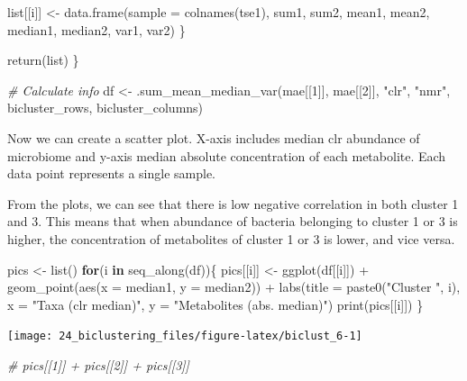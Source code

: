 \documentclass[
]{book}
\newenvironment{Shaded}{\begin{snugshade}}{\end{snugshade}}
\newcommand{\AttributeTok}[1]{\textcolor[rgb]{0.77,0.63,0.00}{#1}}
\newcommand{\CommentTok}[1]{\textcolor[rgb]{0.56,0.35,0.01}{\textit{#1}}}
\newcommand{\ControlFlowTok}[1]{\textcolor[rgb]{0.13,0.29,0.53}{\textbf{#1}}}
\newcommand{\DecValTok}[1]{\textcolor[rgb]{0.00,0.00,0.81}{#1}}
\newcommand{\FunctionTok}[1]{\textcolor[rgb]{0.00,0.00,0.00}{#1}}
\newcommand{\NormalTok}[1]{#1}
\newcommand{\OtherTok}[1]{\textcolor[rgb]{0.56,0.35,0.01}{#1}}
\newcommand{\SpecialCharTok}[1]{\textcolor[rgb]{0.00,0.00,0.00}{#1}}
\newcommand{\StringTok}[1]{\textcolor[rgb]{0.31,0.60,0.02}{#1}}
\begin{document}
\begin{Shaded}
\begin{Highlighting}[]
\NormalTok{    list[[i]] }\OtherTok{\textless{}{-}} \FunctionTok{data.frame}\NormalTok{(}\AttributeTok{sample =} \FunctionTok{colnames}\NormalTok{(tse1), sum1, sum2, mean1, mean2, }
\NormalTok{                     median1, median2, var1, var2)}
\NormalTok{  \}}

  \FunctionTok{return}\NormalTok{(list)}
\NormalTok{\}}

\CommentTok{\# Calculate info}
\NormalTok{df }\OtherTok{\textless{}{-}} \FunctionTok{.sum\_mean\_median\_var}\NormalTok{(mae[[}\DecValTok{1}\NormalTok{]], mae[[}\DecValTok{2}\NormalTok{]], }\StringTok{"clr"}\NormalTok{, }\StringTok{"nmr"}\NormalTok{, bicluster\_rows, bicluster\_columns)}
\end{Highlighting}
\end{Shaded}

Now we can create a scatter plot. X-axis includes median clr abundance of microbiome
and y-axis median absolute concentration of each metabolite. Each data point represents
a single sample.

From the plots, we can see that there is low negative correlation in both cluster 1 and 3.
This means that when abundance of bacteria belonging to cluster 1 or 3 is higher,
the concentration of metabolites of cluster 1 or 3 is lower, and vice versa.

\begin{Shaded}
\begin{Highlighting}[]
\NormalTok{pics }\OtherTok{\textless{}{-}} \FunctionTok{list}\NormalTok{()}
\ControlFlowTok{for}\NormalTok{(i }\ControlFlowTok{in} \FunctionTok{seq\_along}\NormalTok{(df))\{}
\NormalTok{  pics[[i]] }\OtherTok{\textless{}{-}} \FunctionTok{ggplot}\NormalTok{(df[[i]])  }\SpecialCharTok{+}
      \FunctionTok{geom\_point}\NormalTok{(}\FunctionTok{aes}\NormalTok{(}\AttributeTok{x =}\NormalTok{ median1, }\AttributeTok{y =}\NormalTok{ median2)) }\SpecialCharTok{+} 
      \FunctionTok{labs}\NormalTok{(}\AttributeTok{title =} \FunctionTok{paste0}\NormalTok{(}\StringTok{"Cluster "}\NormalTok{, i),}
           \AttributeTok{x =} \StringTok{"Taxa (clr median)"}\NormalTok{,}
           \AttributeTok{y =} \StringTok{"Metabolites (abs. median)"}\NormalTok{)}
  \FunctionTok{print}\NormalTok{(pics[[i]])}
\NormalTok{\}}
\end{Highlighting}
\end{Shaded}

\texttt{[image: 24\_biclustering\_files/figure-latex/biclust\_6-1]}

\begin{Shaded}
\begin{Highlighting}[]
\CommentTok{\# pics[[1]] + pics[[2]] + pics[[3]]}
\end{Highlighting}
\end{Shaded}
\end{document}
